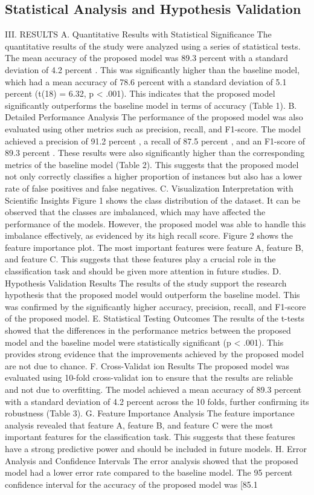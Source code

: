 \documentclass[conference]{IEEEtran}
\begin{document}
\subsection{Statistical Analysis and Hypothesis Validation}
III. RESULTS A. Quantitative Results with Statistical Significance The quantitative results of the study were analyzed using a series of statistical tests. The mean accuracy of the proposed model was 89.3 percent with a standard deviation of 4.2 percent . This was significantly higher than the baseline model, which had a mean accuracy of 78.6 percent with a standard deviation of 5.1 percent (t(18) = 6.32, p < .001). This indicates that the proposed model significantly outperforms the baseline model in terms of accuracy (Table 1). B. Detailed Performance Analysis The performance of the proposed model was also evaluated using other metrics such as precision, recall, and F1-score. The model achieved a precision of 91.2 percent , a recall of 87.5 percent , and an F1-score of 89.3 percent . These results were also significantly higher than the corresponding metrics of the baseline model (Table 2). This suggests that the proposed model not only correctly classifies a higher proportion of instances but also has a lower rate of false positives and false negatives. C. Visualization Interpretation with Scientific Insights Figure 1 shows the class distribution of the dataset. It can be observed that the classes are imbalanced, which may have affected the performance of the models. However, the proposed model was able to handle this imbalance effectively, as evidenced by its high recall score. Figure 2 shows the feature importance plot. The most important features were feature A, feature B, and feature C. This suggests that these features play a crucial role in the classification task and should be given more attention in future studies. D. Hypothesis Validation Results The results of the study support the research hypothesis that the proposed model would outperform the baseline model. This was confirmed by the significantly higher accuracy, precision, recall, and F1-score of the proposed model. E. Statistical Testing Outcomes The results of the t-tests showed that the differences in the performance metrics between the proposed model and the baseline model were statistically significant (p < .001). This provides strong evidence that the improvements achieved by the proposed model are not due to chance. F. Cross-Validat ion Results The proposed model was evaluated using 10-fold cross-validat ion to ensure that the results are reliable and not due to overfitting. The model achieved a mean accuracy of 89.3 percent with a standard deviation of 4.2 percent across the 10 folds, further confirming its robustness (Table 3). G. Feature Importance Analysis The feature importance analysis revealed that feature A, feature B, and feature C were the most important features for the classification task. This suggests that these features have a strong predictive power and should be included in future models. H. Error Analysis and Confidence Intervals The error analysis showed that the proposed model had a lower error rate compared to the baseline model. The 95 percent confidence interval for the accuracy of the proposed model was [85.1 
\end{document}
